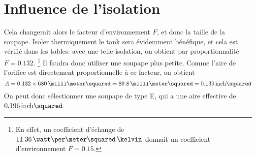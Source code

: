 \section{Influence de l'isolation}
Cela changerait alors le facteur d'environnement $F$,
et donc la taille de la soupape.
Isoler thermiquement le tank sera évidemment bénéfique,
et cela est vérifié dans les tables:
avec une telle isolation, on obtient par proportionnalité $F=0.132$.%
\footnote{En effet, un coefficient d'échange de
$11.36\,\watt\per\meter\squared\,\kelvin$
donnait un coefficient d'environnement $F=0.15$.}
Il faudra donc utiliser une soupape plus petite.
Comme l'aire de l'orifice est directement proportionnelle à ce facteur, on obtient
\begin{equation*}
    A = 0.132 \times 680\,\milli\meter\squared
    = 89.8\,\milli\meter\squared = 0.139\,\inch\squared
\end{equation*}
On peut donc sélectionner une soupape de type E,
qui a une aire effective de $0.196\,\inch\squared$.
